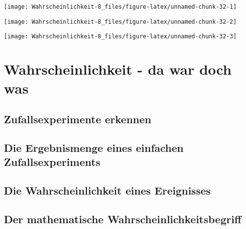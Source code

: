 \documentclass[
  ngerman,
]{book}
\begin{document}
\begin{center}\texttt{[image: Wahrscheinlichkeit-8\_files/figure-latex/unnamed-chunk-32-1]} \end{center}

\begin{center}\texttt{[image: Wahrscheinlichkeit-8\_files/figure-latex/unnamed-chunk-32-2]} \end{center}

\begin{center}\texttt{[image: Wahrscheinlichkeit-8\_files/figure-latex/unnamed-chunk-32-3]} \end{center}

\hypertarget{wahrscheinlichkeit---da-war-doch-was}{%
\section*{Wahrscheinlichkeit - da war doch was}\label{wahrscheinlichkeit---da-war-doch-was}}

\hypertarget{zufallsexperimente-erkennen}{%
\subsection*{Zufallsexperimente erkennen}\label{zufallsexperimente-erkennen}}

\hypertarget{die-ergebnismenge-eines-einfachen-zufallsexperiments}{%
\subsection*{Die Ergebnismenge eines einfachen Zufallsexperiments}\label{die-ergebnismenge-eines-einfachen-zufallsexperiments}}

\hypertarget{die-wahrscheinlichkeit-eines-ereignisses}{%
\subsection*{Die Wahrscheinlichkeit eines Ereignisses}\label{die-wahrscheinlichkeit-eines-ereignisses}}

\hypertarget{der-mathematische-wahrscheinlichkeitsbegriff}{%
\subsection*{Der mathematische Wahrscheinlichkeitsbegriff}\label{der-mathematische-wahrscheinlichkeitsbegriff}}
\end{document}
